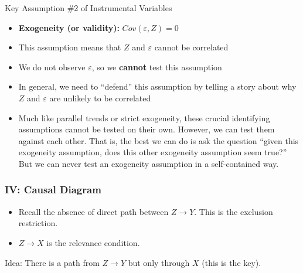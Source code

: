 \documentclass[aspectratio=169,11pt]{beamer}
\begin{document}
\begin{frame}{Key Assumption \#2 of Instrumental Variables}
\begin{itemize}
	\item {\bf Exogeneity (or validity):} $Cov(\varepsilon,Z)= 0$
\medskip
\item This assumption means that $Z$ and $\varepsilon$ cannot be correlated
\medskip
\item We do not observe $\varepsilon$, so we \textbf{cannot} test this assumption
\medskip
\item In general, we need to ``defend'' this assumption by telling a story about why $Z$ and $\varepsilon$ are unlikely to be correlated
\medskip
\item Much like parallel trends or strict exogeneity, these crucial identifying assumptions cannot
be tested on their own. However, we can test them against each other. That is, the best we can
do is ask the question ``given this exogeneity assumption, does this other exogeneity assumption seem
true?'' But we can never test an exogeneity assumption in a self-contained way. 
\end{itemize}
\end{frame}




\begin{frame}
\frametitle{IV: Causal Diagram}
\begin{itemize}
\item Recall the absence of direct path between $Z \rightarrow Y$. This is the \alert{exclusion restriction}.
\item $Z \rightarrow X$ is the \alert{relevance} condition.
\end{itemize}
\vspace{0.5cm}
\begin{center}
\end{center}
Idea: There is a path from $Z \rightarrow Y$ but only \alert{through} $X$ (this is the key).
\end{frame}
\end{document}

